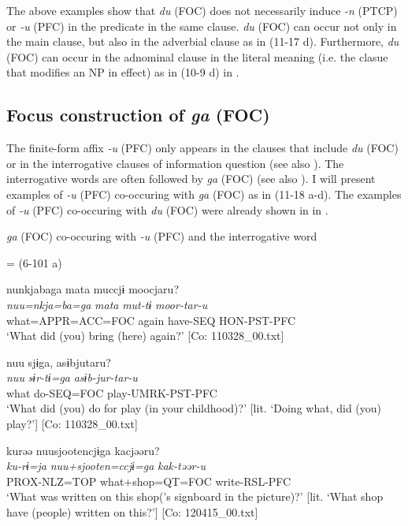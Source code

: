 The above examples show that \textit{du} (FOC) does not necessarily induce \textit{{}-n} (PTCP) or \textit{{}-u} (PFC) in the predicate in the same clause. \textit{du} (FOC) can occur not only in the main clause, but also in the adverbial clause as in (11-17 d). Furthermore, \textit{du} (FOC) can occur in the adnominal clause in the literal meaning (i.e. the clasue that modifies an NP in effect) as in (10-9 d) in .

\subsection{Focus construction of \textit{ga} (FOC)}\label{sec:11.3.2}

The finite-form affix \textit{{}-u} (PFC) only appears in the clauses that include \textit{du} (FOC) or in the interrogative clauses of information question (see also ). The interrogative words are often followed by \textit{ga} (FOC) (see also ). I will present examples of \textit{{}-u} (PFC) co-occuring with \textit{ga} (FOC) as in (11-18 a-d). The examples of \textit{-u} (PFC) co-occuring with \textit{du} (FOC) were already shown in  in .

\ea\label{ex:11-18}  \textit{ga} (FOC) co-occuring with \textit{{}-u} (PFC) and the interrogative word

  \ea{} = (6-101 a)

    
      \glll    nunkjabaga  mata  muccjɨ  moocjaru?\\
      \textit{nuu=nkja=ba=ga}  \textit{mata}  \textit{mut-tɨ}  \textit{moor-tar-u}\\
      what=APPR=ACC=FOC  again  have-SEQ  HON-PST-PFC\\
      \glt       ‘What did (you) bring (here) again?’ [Co: 110328\_00.txt]

  \ex  
      \glll    nuu  sjɨga,  asɨbjutaru?\\
      \textit{nuu}  \textit{sɨr-tɨ=ga}  \textit{asɨb-jur-tar-u}\\
      what  do-SEQ=FOC  play-UMRK-PST-PFC\\
      \glt       ‘What did (you) do for play (in your childhood)?’ [lit. ‘Doing what, did (you) play?’] [Co: 110328\_00.txt]

  \ex  
      \glll    kurəə  nuu{\textbar}sjooten{\textbar}cjɨga  kacjəəru?\\
      \textit{ku-rɨ=ja}  \textit{nuu+sjooten=ccjɨ=ga}  \textit{kak-təər-u}\\
      PROX-NLZ=TOP  what+shop=QT=FOC  write-RSL-PFC\\
      \glt        ‘What was written on this shop(’s signboard in the picture)?’ [lit. ‘What shop have (people) written on this?’]  [Co: 120415\_00.txt]

